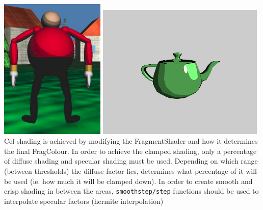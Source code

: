 \documentclass {article}
\begin{document}
\includegraphics[width=50mm]{celshadedmodel.jpg}
\indent \indent \includegraphics[width=80mm]{toonpot.png} \\ \newline
Cel shading is achieved by modifying the FragmentShader and how it determines the final FragColour. In order to achieve the clamped shading, only a percentage of diffuse shading and specular shading must be used. Depending on which range (between thresholds) the diffuse factor lies, determines what percentage of it will be used (ie. how much it will be clamped down). In order to create smooth and crisp shading in between the areas, \texttt{smoothstep/step} functions should be used to interpolate specular factors (hermite interpolation)
\end{document}

